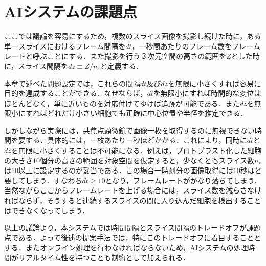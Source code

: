 \section{AIシステムの課題点}
ここでは議論を容易にするため，複数のスライス画像を撮影し続けた時に，ある単一スライスにおけるフレーム間隔を$dt$，一秒間あたりのフレーム数をフレームレートと呼ぶことにする．また撮影を行う３次元空間の高さの範囲を$Z$とした時に，スライス間隔を$dz \equiv Z / n_s$と定義する．
\par
本章で述べた問題設定では，これらの間隔$dt$及び$dz$を無限に小さくすれば容易に目的を達成することができる．なぜならば，$dt$を無限小にすれば時間的な変位はほとんどなく，単に近いものを対応付けてゆけば追跡が可能である．また$dz$を無限小にすればどれだけ小さい細胞でも正確に中心位置や半径を推定できる．
\par
しかしながら実際には，共焦点顕微鏡で画像一枚を取得するのに無視できない時間を要する．具体的には，一枚あたり一秒ほどかかる．これにより，同時に$dt$と$dz$を無限に小さくすることは不可能になる．例えば，プロトプラスト化した細胞の大きさ$10$個分の高さの範囲を対象空間を仮定すると，少なくともスライス数$n_s$は$10$以上に設定するのが妥当である．この場合一時刻分の画像取得には$10$秒ほど要してしまう．すなわち$dt \geq 10$となり，フレームレートがかなり落ちてしまう．当然ながらここからフレームレートを上げる場合には，スライス数を減らさなければならず，そうすると連続するスライスの間に入り込んだ細胞を検出することはできなくなってしまう．
\par
以上の議論より，本システムでは時間間隔とスライス間隔のトレードオフが課題点である．よって後述の提案手法では，特にこのトレードオフに着目することとする．またオンライン処理を行わなければならないため，AIシステムの処理時間がリアルタイム性を持つことも制約として加えられる．